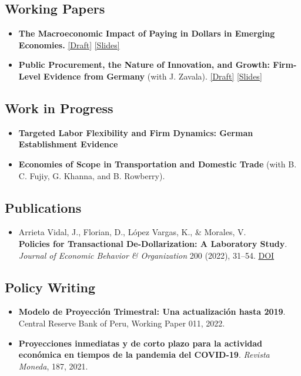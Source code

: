 \documentclass[letterpaper]{article}
\begin{document}
\subsection*{Working Papers}
\begin{itemize}
  \item \textbf{The Macroeconomic Impact of Paying in Dollars in Emerging Economies.}
        \href{https://joharav.github.io/assets/files/March26_draft.pdf}{[Draft]}
        \href{https://joharav.github.io/assets/files/Macro_lunch_Johar_Arrieta.pdf}{[Slides]}
  \item \textbf{Public Procurement, the Nature of Innovation, and Growth: Firm-Level Evidence from Germany} (with J. Zavala).
        \href{https://joharav.github.io/assets/files/TurnoverInnovation_draft_Aug2026.pdf}{[Draft]}
        \href{https://joharav.github.io/assets/files/TurnoverInnovation_slides_Sep2026.pdf}{[Slides]}

\end{itemize}

\subsection*{Work in Progress}
\begin{itemize}
  \item \textbf{Targeted Labor Flexibility and Firm Dynamics: German Establishment Evidence} 

  \item \textbf{Economies of Scope in Transportation and Domestic Trade} (with B. C. Fujiy, G. Khanna, and B. Rowberry).
\end{itemize}

\subsection*{Publications}
\begin{itemize}
  \item Arrieta Vidal, J., Florian, D., L\'opez Vargas, K., \& Morales, V. \\
        \textbf{Policies for Transactional De-Dollarization: A Laboratory Study}. 
        \textit{Journal of Economic Behavior \& Organization} 200 (2022), 31--54. 
        \href{https://doi.org/10.1016/j.jebo.2022.05.012}{DOI}
\end{itemize}

\subsection*{Policy Writing}
\begin{itemize}
  \item \textbf{Modelo de Proyecci\'on Trimestral: Una actualizaci\'on hasta 2019}. 
        Central Reserve Bank of Peru, Working Paper 011, 2022.
  \item \textbf{Proyecciones inmediatas y de corto plazo para la actividad econ\'omica en tiempos de la pandemia del COVID-19}.
        \textit{Revista Moneda}, 187, 2021.
\end{itemize}
\end{document}

